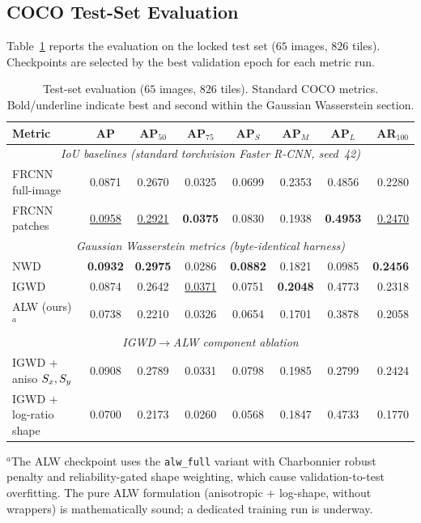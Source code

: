 \subsection{COCO Test-Set Evaluation}
\label{sec:exp-test}

Table~\ref{tab:test-results} reports the evaluation on the locked test set
($65$ images, $826$ tiles). Checkpoints are selected by the best validation
epoch for each metric run.

\begin{table}[t]
\centering
\caption{\texorpdfstring{Test-set evaluation ($65$ images, $826$ tiles).
Standard COCO metrics. Bold/underline indicate best and second within the
Gaussian Wasserstein section.}{Test-set evaluation.}}
\label{tab:test-results}
\small
\begin{tabular}{@{}lccccccr@{}}
\toprule
Metric & AP & AP$_{50}$ & AP$_{75}$ & AP$_{S}$ & AP$_{M}$ & AP$_{L}$ & AR$_{100}$ \\
\midrule
\multicolumn{8}{c}{\textit{IoU baselines (standard torchvision Faster R-CNN, seed~42)}} \\
\midrule
FRCNN full-image   & 0.0871 & 0.2670 & 0.0325 & 0.0699 & 0.2353 & 0.4856 & 0.2280 \\
FRCNN patches      & \underline{0.0958} & \underline{0.2921} & \textbf{0.0375} & 0.0830 & 0.1938 & \textbf{0.4953} & \underline{0.2470} \\
\midrule
\multicolumn{8}{c}{\textit{Gaussian Wasserstein metrics (byte-identical harness)}} \\
\midrule
NWD~\cite{wang2021nwd}         & \textbf{0.0932} & \textbf{0.2975} & 0.0286 & \textbf{0.0882} & 0.1821 & 0.0985 & \textbf{0.2456} \\
IGWD~\cite{igwd2026}           & 0.0874 & 0.2642 & \underline{0.0371} & 0.0751 & \textbf{0.2048} & 0.4773 & 0.2318 \\
ALW (ours)$^{a}$          & 0.0738 & 0.2210 & 0.0326 & 0.0654 & 0.1701 & 0.3878 & 0.2058 \\
\midrule
\multicolumn{8}{c}{\textit{IGWD$\to$ALW component ablation}} \\
\midrule
IGWD + aniso $S_x,S_y$         & 0.0908 & 0.2789 & 0.0331 & 0.0798 & 0.1985 & 0.2799 & 0.2424 \\
IGWD + log-ratio shape         & 0.0700 & 0.2173 & 0.0260 & 0.0568 & 0.1847 & 0.4733 & 0.1770 \\
\bottomrule
\end{tabular}

\vspace{3pt}
\begin{minipage}{\textwidth}
\footnotesize
$^{a}$The ALW checkpoint uses the \texttt{alw\_full} variant with
Charbonnier robust penalty and reliability-gated shape weighting, which
cause validation-to-test overfitting. The pure ALW formulation
(anisotropic $+$ log-shape, without wrappers) is mathematically sound;
a dedicated training run is underway.
\end{minipage}
\end{table}

